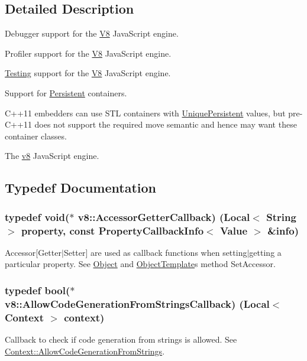 \subsection{Detailed Description}
Debugger support for the \hyperlink{classv8_1_1V8}{V8} Java\+Script engine.

Profiler support for the \hyperlink{classv8_1_1V8}{V8} Java\+Script engine.

\hyperlink{classv8_1_1Testing}{Testing} support for the \hyperlink{classv8_1_1V8}{V8} Java\+Script engine.

Support for \hyperlink{classv8_1_1Persistent}{Persistent} containers.

C++11 embedders can use S\+T\+L containers with \hyperlink{classv8_1_1UniquePersistent}{Unique\+Persistent} values, but pre-\/\+C++11 does not support the required move semantic and hence may want these container classes.

The \hyperlink{namespacev8}{v8} Java\+Script engine. 

\subsection{Typedef Documentation}
\hypertarget{namespacev8_a722613c87061708a4f1aa050d095f868}{}
\subsubsection[{Accessor\+Getter\+Callback}]{\setlength{\rightskip}{0pt plus 5cm}typedef void($\ast$ v8\+::\+Accessor\+Getter\+Callback) ({\bf Local}$<$ {\bf String} $>$ property, const {\bf Property\+Callback\+Info}$<$ {\bf Value} $>$ \&info)}\label{namespacev8_a722613c87061708a4f1aa050d095f868}
Accessor\mbox{[}Getter$\vert$\+Setter\mbox{]} are used as callback functions when setting$\vert$getting a particular property. See \hyperlink{classv8_1_1Object}{Object} and \hyperlink{classv8_1_1ObjectTemplate}{Object\+Template}\textquotesingle{}s method Set\+Accessor. \hypertarget{namespacev8_a521d909ec201742a1cb35d50a8e2a3c2}{}
\subsubsection[{Allow\+Code\+Generation\+From\+Strings\+Callback}]{\setlength{\rightskip}{0pt plus 5cm}typedef bool($\ast$ v8\+::\+Allow\+Code\+Generation\+From\+Strings\+Callback) ({\bf Local}$<$ {\bf Context} $>$ context)}\label{namespacev8_a521d909ec201742a1cb35d50a8e2a3c2}
Callback to check if code generation from strings is allowed. See \hyperlink{classv8_1_1Context_a794ccc42113566f5d363f89c8b0d3c2c}{Context\+::\+Allow\+Code\+Generation\+From\+Strings}. \hypertarget{namespacev8_ab699f4bbbb56350e6e915682e420fcdc}{}
